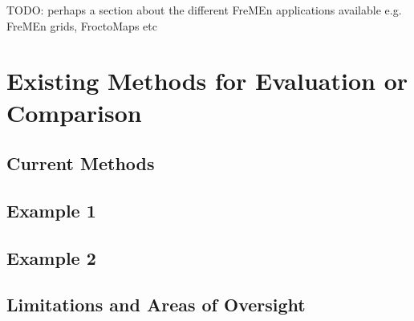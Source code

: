 TODO: perhaps a section about the different FreMEn applications available e.g.
FreMEn grids, FroctoMaps etc

\section{ Existing Methods for Evaluation or Comparison }

\subsection{ Current Methods }
\subsection { Example 1 }
\subsection { Example 2 }

\subsection{ Limitations and Areas of Oversight }
